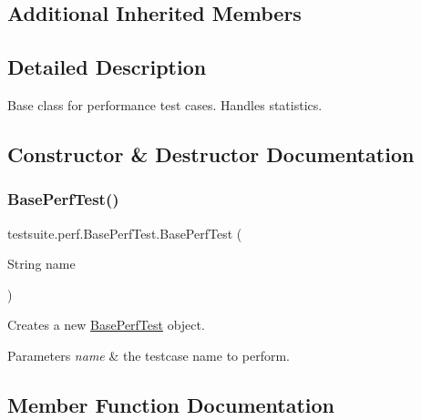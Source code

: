 \subsection*{Additional Inherited Members}


\subsection{Detailed Description}
Base class for performance test cases. Handles statistics. 

\subsection{Constructor \& Destructor Documentation}
\mbox{\label{classtestsuite_1_1perf_1_1_base_perf_test_a31aa6418a4c1089b614c41ea0b9bd924}} 
\subsubsection{\texorpdfstring{Base\+Perf\+Test()}{BasePerfTest()}}
{\footnotesize\ttfamily testsuite.\+perf.\+Base\+Perf\+Test.\+Base\+Perf\+Test (\begin{DoxyParamCaption}\item[{String}]{name }\end{DoxyParamCaption})}

Creates a new \mbox{\hyperlink{classtestsuite_1_1perf_1_1_base_perf_test}{Base\+Perf\+Test}} object.


\begin{DoxyParams}{Parameters}
{\em name} & the testcase name to perform. \\
\hline
\end{DoxyParams}


\subsection{Member Function Documentation}
\mbox{\label{classtestsuite_1_1perf_1_1_base_perf_test_a4949a27d2e0b9c314d12f45128004da2}} 
